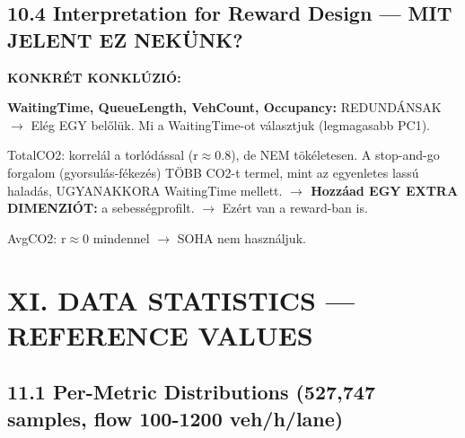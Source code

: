 \documentclass[11pt,a4paper]{article}
\begin{document}
\subsection*{10.4 Interpretation for Reward Design — MIT JELENT EZ NEKÜNK?}
\textbf{KONKRÉT KONKLÚZIÓ:}
\par\noindent\hspace*{1em}\textbullet{} \textbf{WaitingTime, QueueLength, VehCount, Occupancy:} REDUNDÁNSAK
$\rightarrow$ Elég EGY belőlük. Mi a WaitingTime-ot választjuk (legmagasabb PC1).
\par\noindent\hspace*{1em}\textbullet{} TotalCO2: korrelál a torlódással (r$\approx$0.8), de NEM tökéletesen.
A stop-and-go forgalom (gyorsulás-fékezés) TÖBB CO2-t termel,
mint az egyenletes lassú haladás, UGYANAKKORA WaitingTime mellett.
\textbf{$\rightarrow$ Hozzáad EGY EXTRA DIMENZIÓT:} a sebességprofilt.
$\rightarrow$ Ezért van a reward-ban is.
\par\noindent\hspace*{1em}\textbullet{} AvgCO2: r$\approx$0 mindennel $\rightarrow$ SOHA nem használjuk.


\section*{XI. DATA STATISTICS — REFERENCE VALUES}

\subsection*{11.1 Per-Metric Distributions (527,747 samples, flow 100-1200 veh/h/lane)}
\end{document}
